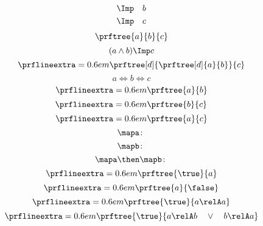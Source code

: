 {\begin{forslides}
\begin{equation*}
\begin{aligned}
				\Imp \quad & b \\
				\Imp \quad & c
			\end{aligned}
		\end{equation*}
		\begin{equation*}
			\label{eq:abc_3}
			\prftree{a}{b}{c}
		\end{equation*}
		\begin{equation*}
			\label{eq:abc_4}
			(a\wedge b)\Imp c
		\end{equation*}
		\begin{equation*}
			\label{eq:abc_5}
			\prflineextra=0.6em
			\prftree[d]
			{\prftree[d]
				{a}
				{b}}
			{c}
		\end{equation*}
		\begin{equation*}
			\label{eq:abc_6}
			a\Leftrightarrow b \Leftrightarrow c
		\end{equation*}
		\begin{equation*}
			\label{eq:abc_7}
			\prflineextra=0.6em
			\prftree{a}{b}
		\end{equation*}
		\begin{equation*}
			\label{eq:abc_8}
			\prflineextra=0.6em
			\prftree{b}{c}
		\end{equation*}
		\begin{equation*}
			\label{eq:abc_9}
			\prflineextra=0.6em
			\prftree{a}{c}
		\end{equation*}
		\begin{equation*}
			\label{eq:mapf}
			\mapa \colon
		\end{equation*}
		\begin{equation*}
			\label{eq:mapg}
			\mapb \colon
		\end{equation*}
		\begin{equation*}
			\label{eq:mapcomp}
			\mapa \then \mapb \colon
		\end{equation*}
		\begin{equation*}
			\label{eq:top1}
			\prflineextra=0.6em
			\prftree{\true}{a}
		\end{equation*}
		\begin{equation*}
			\label{eq:bot1}
			\prflineextra=0.6em
			\prftree{a}{\false}
		\end{equation*}
		\begin{equation*}
			\label{eq:rel_refl}
			\prflineextra=0.6em
			\prftree{\true}{a\relA a}
		\end{equation*}
		\begin{equation*}
			\label{eq:rel_tot}
			\prflineextra=0.6em
			\prftree{\true}{a\relA b \quad \vee \quad b\relA a}

\end{equation*}
\end{forslides}}

